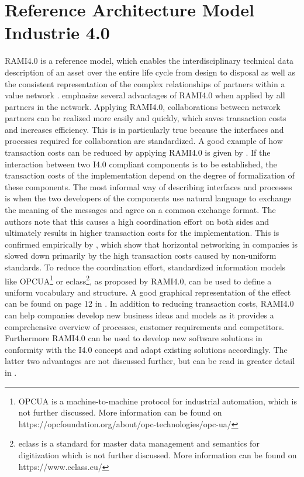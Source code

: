 \section{Reference Architecture Model Industrie 4.0} \label{sec:rami40}
\ac{RAMI4.0} is a reference model, which enables the interdisciplinary technical data description of an asset over the entire life cycle from design to disposal as well as the consistent representation of the complex relationships of partners within a value network \cite[p. 4]{Heidel2017ReferenzarchitekturmodellIndustrie4.0Komponente}. \citet[p. 23]{Arnold2018DigitaleMittelstand} emphasize several advantages of \ac{RAMI4.0} when applied by all partners in the network. Applying \ac{RAMI4.0}, collaborations between network partners can be realized more easily and quickly, which saves transaction costs and increases efficiency. This is in particularly true because the interfaces and processes required for collaboration are standardized. A good example of how transaction costs can be reduced by applying \ac{RAMI4.0} is given by \citet[p. 11]{Bayha2020DescribingComponents}. If the interaction between two \ac{I4.0} compliant components is to be established, the transaction costs of the implementation depend on the degree of formalization of these components. The most informal way of describing interfaces and processes is when the two developers of the components use natural language to exchange the meaning of the messages and agree on a common exchange format. The authors note that this causes a high coordination effort on both sides and ultimately results in higher transaction costs for the implementation. This is confirmed empirically by \citet[p. 14]{Arnold2018DigitaleMittelstand}, which show that horizontal networking in companies is slowed down primarily by the high transaction costs caused by non-uniform standards. To reduce the coordination effort, standardized information models like \ac{OPCUA}\footnote{\ac{OPCUA} is a machine-to-machine protocol for industrial automation, which is not further discussed. More information can be found on https://opcfoundation.org/about/opc-technologies/opc-ua/} or eclass\footnote{eclass is a standard for master data management and semantics for digitization which is not further discussed. More information can be found on https://www.eclass.eu/}, as proposed by \ac{RAMI4.0}, can be used to define a uniform vocabulary and structure. A good graphical representation of the effect can be found on page 12 in \citet{Bayha2020DescribingComponents}. In addition to reducing transaction costs, \ac{RAMI4.0} can help companies develop new business ideas and models as it provides a comprehensive overview of processes, customer requirements and competitors. Furthermore \ac{RAMI4.0} can be used to develop new software solutions in conformity with the \ac{I4.0} concept and adapt existing solutions accordingly. The latter two advantages are not discussed further, but can be read in greater detail in \citet[p. 24 ff]{Arnold2018DigitaleMittelstand}.

